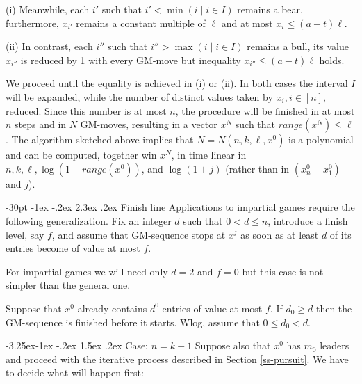 \documentclass[10pt]{article}
\makeatletter
\renewcommand\section{\@startsection {section}{1}{\z@}
{-30pt \@plus -1ex \@minus -.2ex}
{2.3ex \@plus.2ex}
{\normalfont\normalsize\bfseries\boldmath}}
\renewcommand\subsection{\@startsection{subsection}{2}{\z@}
{-3.25ex\@plus -1ex \@minus -.2ex}
{1.5ex \@plus .2ex}
{\normalfont\normalsize\bfseries\boldmath}}
\theoremstyle{definition}
\makeatother
\begin{document}
\smallskip 

(i) Meanwhile, each $i'$ such that  
$i' < \min (i \mid i \in I)$  remains a bear, 
furthermore, $x_{i'}$ remains a constant multiple of $\ell$ 
and at most  $x_i \leq (a-t) \ell$.

\smallskip 

(ii) In contrast, each  $i''$  
such that  $i'' > \max (i \mid i \in I)$ remains a bull,  
its value $x_{i''}$  is reduced by 1 
with every GM-move but inequality 
$x_{i''} \leq (a-t) \ell$  holds.

\smallskip 

We proceed until the equality is achieved in (i) or (ii).
In both cases the interval $I$ will be expanded,  
while the number of distinct values 
taken by $x_i, i \in [n],$  reduced. 
Since this number is at most $n$, 
the procedure will be finished 
in at most $n$ steps and in $N$  GM-moves, 
resulting in a vector  $x^N$  
such that  $range(x^N) \leq \ell$. 
The algorithm sketched above implies 
that $N=N(n,k,\ell,x^0)$ is a polynomial 
and can be computed, together win $x^N$,
in time linear in 
$n,k,\ell, \log(1 + range(x^0))$, and $\log (1+j)$  
(rather than in $(x^0_n - x^0_1)$ and $j$).

\section{Finish line}
Applications to impartial games 
require the following generalization. 
Fix an integer  $d$  such that $0 < d \leq n$,   
introduce a finish level, say $f$, and assume that 
GM-sequence stops at $x^j$  as soon as 
at least  $d$  of its entries 
become of value at most  $f$.

For impartial games we will need only 
$d=2$ and $f=0$  but this case is not simpler 
than the general one. 

Suppose that $x^0$ already contains 
$d^0$  entries of value at most  $f$. 
If $d_0 \geq d$  then the GM-sequence 
is finished before it starts. 
Wlog, assume that $0 \leq d_0 < d$. 

\subsection{Case: $n = k+1$}
Suppose also that $x^0$ has $m_0$ leaders 
and proceed with the iterative process described 
in Section \ref{ss-pursuit}. 
We have to decide what will happen first: 
\end{document}
